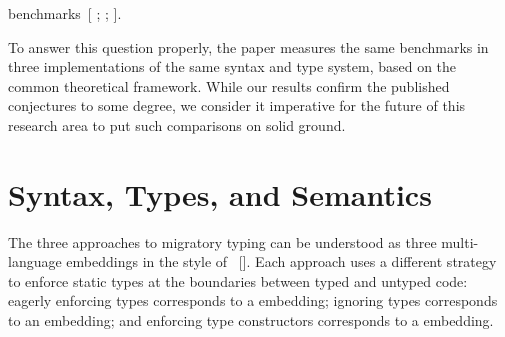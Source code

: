 \documentclass[screen=true, 10pt, acmsmall]{acmart}
\makeatletter
\newcommand{\sectionNewpage}{}
\newcommand{\Sendabbrev}[1]{#1\@}
\let\SOriginalthesubsection\thesubsection
\newcommand{\Ssection}[2]{\section[#1]{#2}\let\thesubsection\SOriginalthesubsection}
\newcommand{\AutobibLink}[1]{\color{ACMPurple}{#1}}
\newcommand{\Autobibref}[1]{#1}
\providecommand{\AutobibLink}[1]{#1}
\newcommand{\holong}{higher-order}
\newcommand{\eolong}{erasure}
\newcommand{\folong}{first-order}
\makeatother
\begin{document}
\begin{itemize}
 benchmarks\Autobibref{~[\hyperref[t:x28autobib_x22Ben_Greenman_and_Zeina_MigeedOn_the_Cost_of_Typex2dTag_SoundnessWorkshop_on_Partial_Evaluation_and_Program_Manipulationx2c_ppx2e_30x2dx2d392018x22x29]{\AutobibLink{Greenman and Migeed}} \hyperref[t:x28autobib_x22Ben_Greenman_and_Zeina_MigeedOn_the_Cost_of_Typex2dTag_SoundnessWorkshop_on_Partial_Evaluation_and_Program_Manipulationx2c_ppx2e_30x2dx2d392018x22x29]{\AutobibLink{2018}}; \hyperref[t:x28autobib_x22Fabian_Muehlboeck_and_Ross_TateSound_Gradual_Typing_is_Nominally_Alive_and_WellProceedings_of_the_ACM_on_Programming_Languages_1x28OOPSLAx29x2c_ppx2e_56x3a1x2dx2d56x3a302017x22x29]{\AutobibLink{Muehlboeck and Tate}} \hyperref[t:x28autobib_x22Fabian_Muehlboeck_and_Ross_TateSound_Gradual_Typing_is_Nominally_Alive_and_WellProceedings_of_the_ACM_on_Programming_Languages_1x28OOPSLAx29x2c_ppx2e_56x3a1x2dx2d56x3a302017x22x29]{\AutobibLink{2017}}; \hyperref[t:x28autobib_x22Michael_Mx2e_Vitousekx2c_Cameron_Swordsx2c_and_Jeremy_Gx2e_SiekBig_Types_in_Little_Runtimex3a_Openx2dWorld_Soundness_and_Collaborative_Blame_for_Gradual_Type_SystemsSymposium_on_Principles_of_Programming_Languagesx2c_ppx2e_762x2dx2d7742017x22x29]{\AutobibLink{Vitousek et al\Sendabbrev{.}}} \hyperref[t:x28autobib_x22Michael_Mx2e_Vitousekx2c_Cameron_Swordsx2c_and_Jeremy_Gx2e_SiekBig_Types_in_Little_Runtimex3a_Openx2dWorld_Soundness_and_Collaborative_Blame_for_Gradual_Type_SystemsSymposium_on_Principles_of_Programming_Languagesx2c_ppx2e_762x2dx2d7742017x22x29]{\AutobibLink{2017}}]}.

To answer this question properly, the paper measures
 the same benchmarks in three implementations of the same syntax and type system,
 based on the common theoretical framework.
 While our results confirm the published conjectures to some degree, we
 consider it imperative for the future of this research area to put such comparisons
 on solid ground.\end{itemize}

\sectionNewpage

\Ssection{Syntax, Types, and Semantics}{Syntax, Types, and Semantics}\label{t:x28part_x22secx3adesignx22x29}

The three approaches to migratory typing can be understood as three
 multi{-}language embeddings in the style of \Autobibref{\hyperref[t:x28autobib_x22Jacob_Matthews_and_Robert_Bruce_FindlerOperational_Semantics_for_Multix2dlanguage_ProgramsTransactions_on_Programming_Languages_and_Systems_31x283x29x2c_ppx2e_1x2dx2d442009x22x29]{\AutobibLink{Matthews and Findler}}~[\hyperref[t:x28autobib_x22Jacob_Matthews_and_Robert_Bruce_FindlerOperational_Semantics_for_Multix2dlanguage_ProgramsTransactions_on_Programming_Languages_and_Systems_31x283x29x2c_ppx2e_1x2dx2d442009x22x29]{\AutobibLink{2009}}]}.
Each approach uses a different strategy to enforce static types at the
 boundaries between typed and untyped code:
eagerly enforcing types corresponds to a \textit{\relax{\holong}} embedding;
ignoring types corresponds to an \textit{\relax{\eolong}} embedding; and
enforcing type constructors corresponds to a \textit{\relax{\folong}} embedding.
\end{document}
